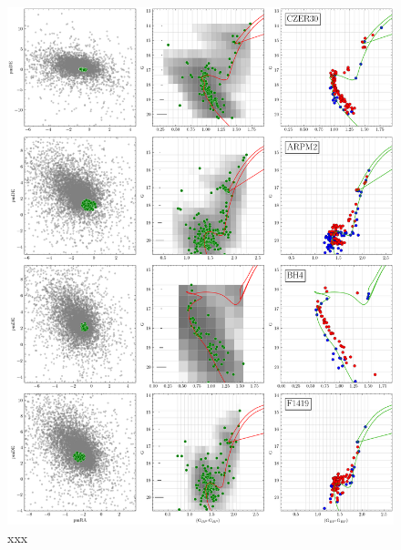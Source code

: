 \documentclass[draft]{aa}
\begin{document}
\begin{appendix}
 \begin{figure}
  \centering
  \includegraphics[height=.95\textheight]{figs/8_fpars.png}
  \caption{xxx}
  \label{fig:12fpars}
 \end{figure}


\end{appendix}
\end{document}
